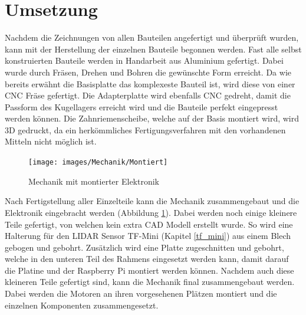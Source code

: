 \section{Umsetzung}
Nachdem die Zeichnungen von allen Bauteilen angefertigt und überprüft wurden, kann mit der Herstellung der einzelnen Bauteile begonnen werden. Fast alle selbst konstruierten Bauteile werden in Handarbeit aus Aluminium gefertigt. Dabei wurde durch Fräsen, Drehen und Bohren die gewünschte Form erreicht. Da wie bereits erwähnt die Basisplatte das komplexeste Bauteil ist, wird diese von einer \ac{CNC} Fräse gefertigt. Die Adapterplatte wird ebenfalls  \ac{CNC} gedreht, damit die Passform des Kugellagers erreicht wird und die Bauteile perfekt eingepresst werden können. Die Zahnriemenscheibe, welche auf der Basis montiert wird, wird \ac{3D} gedruckt, da ein herkömmliches Fertigungsverfahren mit den vorhandenen Mitteln nicht möglich ist.\\
\begin{figure}[H]
	\centering
	\texttt{[image: images/Mechanik/Montiert]}
	\caption{Mechanik mit montierter Elektronik}
	\label{montiert}
\end{figure}
Nach Fertigstellung aller Einzelteile kann die Mechanik zusammengebaut und die Elektronik eingebracht werden (Abbildung \ref{montiert}). Dabei werden noch einige kleinere Teile gefertigt, von welchen kein extra \ac{CAD} Modell erstellt wurde. So wird eine Halterung für den \ac{LIDAR} Sensor TF-Mini (Kapitel \ref{tf_mini}) aus einem Blech gebogen und gebohrt. Zusätzlich wird eine Platte zugeschnitten und gebohrt, welche in den unteren Teil des Rahmens eingesetzt werden kann, damit darauf die Platine und der Raspberry Pi montiert werden können. Nachdem auch diese kleineren Teile gefertigt sind, kann die Mechanik final zusammengebaut werden. Dabei werden die Motoren an ihren vorgesehenen Plätzen montiert und die einzelnen Komponenten zusammengesetzt.

